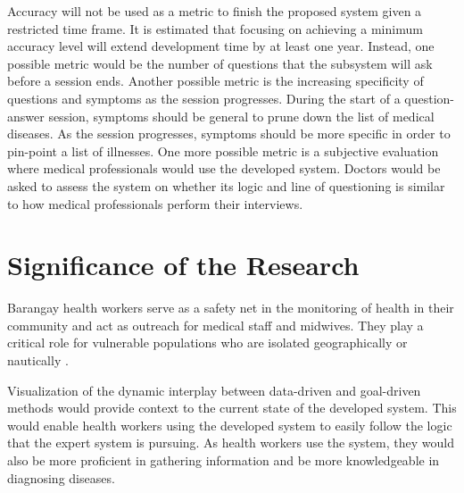 Accuracy will not be used as a metric to finish the proposed system given a restricted time frame.
It is estimated that focusing on achieving a minimum accuracy level will extend development time by at least one year.
Instead, one possible metric would be the number of questions that the subsystem will ask before a session ends.
Another possible metric is the increasing specificity of questions and symptoms as the session progresses.
During the start of a question-answer session, symptoms should be general to prune down the list of medical diseases.
As the session progresses, symptoms should be more specific in order to pin-point a list of illnesses.
One more possible metric is a subjective evaluation where medical professionals would use the developed system.
Doctors would be asked to assess the system on whether its logic and line of questioning is similar to how medical professionals perform their interviews.

\section{Significance of the Research}
\label{sec:significance}

Barangay health workers serve as a safety net in the monitoring of health in their community and act as outreach for medical staff and midwives.
They play a critical role for vulnerable populations who are isolated geographically or nautically \cite{DirectRelief:2014}.

Visualization of the dynamic interplay between data-driven and goal-driven methods would provide context to the current state of the developed system.
This would enable health workers using the developed system to easily follow the logic that the expert system is pursuing. 
As health workers use the system, they would also be more proficient in gathering information and be more knowledgeable in diagnosing diseases.
